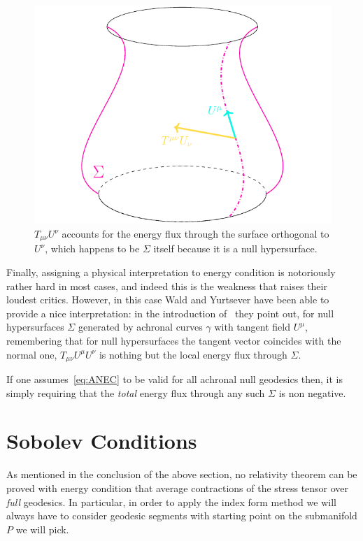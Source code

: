 \begin{figure}
    \centering
    \includegraphics[scale=0.65]{Immagini/ANEC/ANEC.pdf}
    \caption{\(T_{\mu\nu}U^{\nu}\) accounts for the energy flux through the surface orthogonal to \(U^{\nu}\), which happens to be \(\Sigma\) itself because it is a null hypersurface.}
    \label{fig:ANEC}
\end{figure}

Finally, assigning a physical interpretation to energy condition is notoriously rather hard in most cases, and indeed this is the weakness that raises their loudest critics.
However, in this case Wald and Yurtsever have been able to provide a nice interpretation: in the introduction of~\cite[]{wald1991general} they point out, for null hypersurfaces \(\Sigma\) generated by achronal curves \(\gamma\) with tangent field \(U^{\mu}\), remembering that for null hypersurfaces the tangent vector coincides with the normal one, \(T_{\mu\nu}U^{\mu}U^{\nu}\) is nothing but the local energy flux through \(\Sigma\).

If one assumes~\eqref{eq:ANEC} to be valid for all achronal null geodesics then, it is simply requiring that the \emph{total} energy flux through any such \(\Sigma\) is non negative.

\section{Sobolev Conditions}
\label{sec:sobolev-conditions}
As mentioned in the conclusion of the above section, no relativity theorem can be proved with energy condition that average contractions of the stress tensor over \emph{full} geodesics. In particular, in order to apply the index form method we will always have to consider geodesic segments with starting point on the submanifold \(P\) we will pick.

